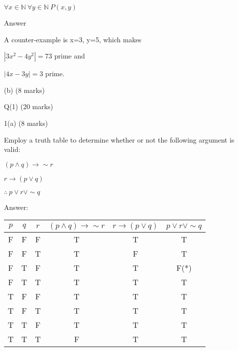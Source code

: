\documentclass[a4paper,12pt,oneside]{book}
\theoremstyle{definition}
\begin{document}
$\forall x \in \mathbb{N} \ \forall y \in \mathbb{N} \ P(x,y)$

Answer

A counter-example is x=3, y=5, which makes

$|3x^2-4y^2| = 73$ prime and

$|4x-3y| = 3$ prime.

(b) (8 marks)











































\newpage




Q(1) (20 marks)

1(a) (8 marks)

Employ a truth table to determine whether or not the following argument is valid:

$(p \wedge q) \longrightarrow \sim r$

$r \longrightarrow (p \vee q)$

$\therefore \ p \vee r \vee \sim q$

Answer:

\begin{center}
	\begin{tabular}{|ccc|c|c|c|}
		\hline
		$p$ & $q$ & $r$ &$(p \wedge q) \longrightarrow \sim r$ & $r \longrightarrow (p \vee q)$ & $p \vee r \vee \sim q$ \\
		\hline
		F & F & F & T & T & T \\
		\hline
		F & F & T & T & F & T \\
		\hline
		F & T & F & T & T & F(*) \\
		\hline
		F & T & T & T & T & T \\
		\hline
		T & F & F & T & T & T \\
		\hline
		T & F & T & T & T & T \\
		\hline
		T & T & F & T & T & T \\
		\hline
		T & T & T & F & T & T \\
		\hline  
	\end{tabular} 
\end{center}
\end{document}
